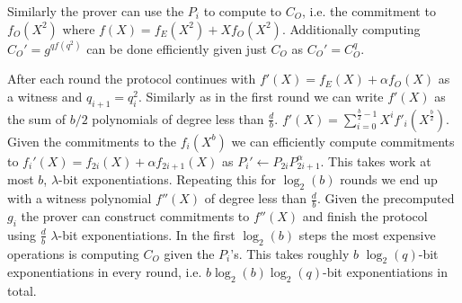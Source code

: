 \documentclass[12pt]{article}
\theoremstyle{Definition}
\begin{document}
Similarly the prover can use the $P_i$ to compute to $C_O$, i.e. the commitment to $f_O(X^2)$ where $f(X)=f_E(X^2)+Xf_O(X^2)$. Additionally computing $C_O'=g^{q f(q^2)}$ can be done efficiently given just $C_O$ as $C_O'=C_O^q$. 

After each round the protocol continues with $f'(X)=f_E(X)+\alpha f_O(X)$ as a witness and $q_{i+1}=q_{i}^2$. Similarly as in the first round we can write $f'(X)$ as the sum of $b/2$ polynomials of degree less than $\frac{d}{b}$.
$f'(X)=\sum_{i=0}^{\frac{b}{2}-1} X^i f'_i(X^{\frac{b}{2}})$. Given the commitments to the $f_i(X^b)$ we can efficiently compute commitments to $f_i'(X)=f_{2i}(X)+\alpha f_{2i+1}(X)$ as $P_i'\gets P_{2i}P_{2i+1}^{\alpha}$. This takes work at most $b$, $\lambda$-bit exponentiations. Repeating this for $\log_2(b)$ rounds we end up with a witness polynomial $f''(X)$ of degree less than $\frac{d}{b}$. Given the precomputed $g_i$ the prover can construct commitments to $f''(X)$ and finish the protocol using $\frac{d}{b}$ $\lambda$-bit exponentiations. In the first $\log_2(b)$ steps the most expensive operations is computing $C_O$ given the $P_i$'s. This takes roughly $b$ $\log_2(q)$-bit exponentiations in every round, i.e. $b\log_2(b) \log_2(q)$-bit exponentiations in total.
\end{document}
